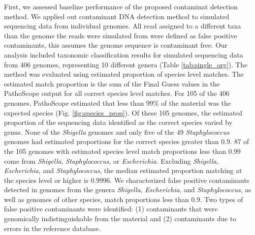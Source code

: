 \documentclass[fleqn,10pt,lineno]{wlpeerj}\usepackage[]{graphicx}\usepackage[]{color}
\begin{document}
First, we assessed baseline performance of the proposed contaminat detection method. 
We applied out contaminant DNA detection method to simulated sequencing data from individual genomes. 
All read assigned to a different taxa than the genome the reads were simulated from were defined as false positive contaminants, 
this assumes the genome sequence is contaminant free. 
Our analysis included taxonomic classification results for simulated sequencing data  from 406 genomes, representing 10 different genera (Table \ref{tab:single_org}).
The method was evaluated using estimated proportion of species level matches.
The estimated match proportion is the sum of the Final Guess values in the PathoScope output for all correct species level matches.
For 105 of the 406 genomes, PathoScope estimated that less than 99\% of the material was the expected species (Fig. \ref{fig:species_prop}).
Of these 105 genomes, the estimated proportion of the sequencing data identified as the correct species varied by genus.
None of the \textit{Shigella} genomes and only five of the 49 \textit{Staphylococcus} genomes had estimated proportions for the correct species greater than 0.9.
87 of the 105 genomes with estimated species level match proportions less than 0.99 come from \textit{Shigella}, \textit{Staphylococcus}, or \textit{Escherichia}.
Excluding \textit{Shigella}, \textit{Escherichia}, and \textit{Staphylococcus}, the median estimated proportion matching at the species level or higher is  0.9996.
We characterized false positive contaminants detected in genomes from the genera \textit{Shigella}, \textit{Escherichia}, and \textit{Staphylococcus}, as well as genomes of other species, match proportions less than 0.9.
Two types of false positive contaminants were identified: (1) contaminants that were genomically indistinguishable from the material and (2) contaminants due to errors in the reference database.
\end{document}
